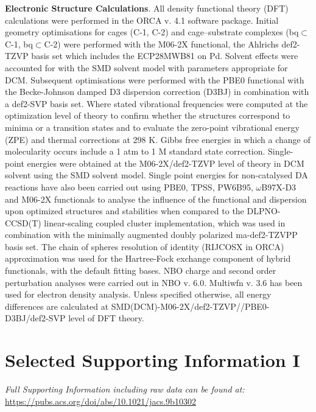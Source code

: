 \documentclass[../../main.tex]{subfiles}
\begin{document}
{\bfseries{Electronic Structure Calculations}}. All density functional theory (DFT) calculations were performed in the ORCA v. 4.1 software package.\cite{Neese2017} Initial geometry optimisations for cages (C-1, C-2) and cage–substrate complexes (bq$\subset$C-1, bq$\subset$C-2) were performed with the M06-2X functional,\cite{Zhao2007} the Ahlrichs def2-TZVP\cite{Weigend2005, Weigend2006} basis set which includes the ECP28MWB81 on Pd. Solvent effects were accounted for with the SMD\cite{Marenich2009} solvent model with parameters appropriate for DCM. Subsequent optimisations were performed with the PBE0\cite{Adamo1999} functional with the Becke-Johnson damped D3 dispersion correction (D3BJ)\cite{Johnson2006} in combination with a def2-SVP basis set. Where stated vibrational frequencies were computed at the optimization level of theory to confirm whether the structures correspond to minima or a transition states and to evaluate the zero-point vibrational energy (ZPE) and thermal corrections at 298 K. Gibbs free energies in which a change of molecularity occurs include a 1 atm to 1 M standard state correction. 
Single-point energies were obtained at the M06-2X/def2-TZVP level of theory in DCM solvent using the SMD solvent model. Single point energies for non-catalysed DA reactions have also been carried out using PBE0,\cite{Adamo1999} TPSS,\cite{TPSS} PW6B95,\cite{Zhao2005} $\omega$B97X-D3\cite{Chai2008} and M06-2X\cite{Zhao2007} functionals to analyse the influence of the functional and dispersion upon optimized structures and stabilities when compared to the DLPNO-CCSD(T)\cite{Riplinger2016} linear-scaling coupled cluster implementation, which was used in combination with the minimally augmented doubly polarized ma-def2-TZVPP basis set. The chain of spheres resolution of identity (RIJCOSX in ORCA) approximation was used for the Hartree-Fock exchange component of hybrid functionals, with the default fitting bases. NBO charge and second order perturbation analyses were carried out in NBO\cite{Glendening2013} v. 6.0. Multiwfn v. 3.6\cite{Lu2011} has been used for electron density analysis. Unless specified otherwise, all energy differences are calculated at SMD(DCM)-M06-2X/def2-TZVP//PBE0-D3BJ/def2-SVP level of DFT theory.


\clearpage
\section{Selected Supporting Information I}
\emph{Full Supporting Information including raw data can be found at:}\\ {\url{https://pubs.acs.org/doi/abs/10.1021/jacs.9b10302}}
\end{document}
